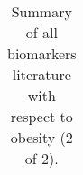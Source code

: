 \begin{table}[!htbp]
{\begin{tabular}{ lp{10cm} p{10cm} l }
    \end{tabular}
 } 
 
    \caption{Summary of all biomarkers literature with respect to obesity (2 of 2).}
    \label{table:biomarkersReferences2of2DF}

\end{table}

